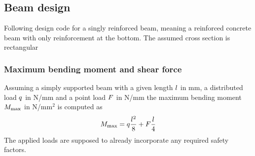 \subsection{Beam design}
Following design code \citeauthor{DIN1992-1-1} for a singly reinforced beam, meaning a reinforced concrete beam with only reinforcement at the bottom.
The assumed cross section is rectangular

\subsubsection{Maximum bending moment and shear force}
Assuming a simply supported beam with a given length $l$ in mm, a distributed load $q$ in N/mm and a point load $F$ in N/mm
the maximum bending moment $M_{\text{max}}$ in N/mm$^2$ is computed as
\begin{align}
	M_{\text{max}}= q \frac{l^2}{8} + F \frac{l}{4}
\end{align}
The applied loads are supposed to already incorporate any required safety factors.
